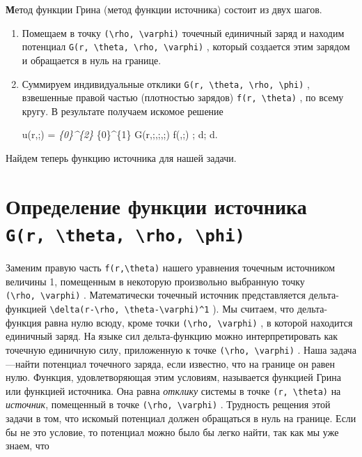 \documentclass[
  ukrainian,
]{article}
\begin{document}
\textbf{М}етод функции Грина (метод функции источника) состоит из двух
шагов.

\begin{enumerate}
\def\labelenumi{\arabic{enumi}.}
\item
  Помещаем в точку
  \texttt{(\textbackslash{}rho,\ \textbackslash{}varphi)} точечный
  единичный заряд и находим потенциал
  \texttt{G(r,\ \textbackslash{}theta,\ \textbackslash{}rho,\ \textbackslash{}varphi)}
  , который создается этим зарядом и обращается в нуль на границе.
\item
  Суммируем индивидуальные отклики
  \texttt{G(r,\ \textbackslash{}theta,\ \textbackslash{}rho,\ \textbackslash{}phi)}
  , взвешенные правой частью (плотностью зарядов)
  \texttt{f(r,\ \textbackslash{}theta)} , по всему кругу. В результате
  получаем искомое решение

  u\left(r,;\theta\right) = \int\emph{\{0\}\^{}\{2\pi\}
  \int}\{0\}\^{}\{1\} G\left(r,;\theta,;\rho,;\varphi\right)
  f\left(\rho,;\varphi\right) \rho ; d\rho ; d\varphi.
\end{enumerate}

Найдем теперь функцию источника для нашей задачи.

\section{\texorpdfstring{Определение функции источника
\texttt{G(r,\ \textbackslash{}theta,\ \textbackslash{}rho,\ \textbackslash{}phi)}}{Определение функции источника G(r, \textbackslash theta, \textbackslash rho, \textbackslash phi)}}\label{ux43eux43fux440ux435ux434ux435ux43bux435ux43dux438ux435-ux444ux443ux43dux43aux446ux438ux438-ux438ux441ux442ux43eux447ux43dux438ux43aux430-gr-theta-rho-phi}

Заменим правую часть \texttt{f(r,\textbackslash{}theta)} нашего
уравнения точечным источником величины 1, помещенным в некоторую
произвольно выбранную точку
\texttt{(\textbackslash{}rho,\ \textbackslash{}varphi)} . Математически
точечный источник представляется дельта-функцией
\texttt{\textbackslash{}delta(r-\textbackslash{}rho,\ \textbackslash{}theta-\textbackslash{}varphi)\^{}1}
). Мы считаем, что дельта-функция равна нулю всюду, кроме точки
\texttt{(\textbackslash{}rho,\ \textbackslash{}varphi)} , в которой
находится единичный заряд. На языке сил дельта-функцию можно
интерпретировать как точечную единичную силу, приложенную к точке
\texttt{(\textbackslash{}rho,\ \textbackslash{}varphi)} . Наша
задача---найти потенциал точечного заряда, если известно, что на границе
он равен нулю. Функция, удовлетворяющая этим условиям, называется
функцией Грина или функцией источника. Она равна \emph{отклику} системы
в точке \texttt{(r,\ \textbackslash{}theta)} на \emph{источник},
помещенный в точке
\texttt{(\textbackslash{}rho,\ \textbackslash{}varphi)} . Трудность
рещения этой задачи в том, что искомый потенциал должен обращаться в
нуль на границе. Если бы не это условие, то потенциал можно было бы
легко найти, так как мы уже знаем, что
\end{document}
